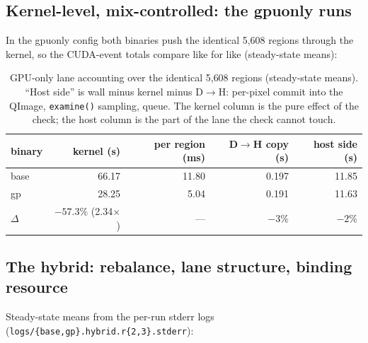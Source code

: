 \documentclass[
	english,
	letterpaper, oneside
]{article}
\begin{document}
\subsection{Kernel-level, mix-controlled: the gpuonly runs}

In the gpuonly config both binaries push the identical 5{,}608 regions
through the kernel, so the CUDA-event totals compare like for like
(steady-state means):

\begin{table}[H]
\centering
\caption{GPU-only lane accounting over the identical 5{,}608 regions
(steady-state means). ``Host side'' is wall minus kernel minus D$\to$H:
per-pixel commit into the QImage, \texttt{examine()} sampling, queue. The
kernel column is the pure effect of the check; the host column is the part
of the lane the check cannot touch.}
\label{tab:gpuonly}
\small
\begin{tabular}{lrrrr}
\toprule
binary & kernel (s) & per region (ms) & D$\to$H copy (s) & host side (s) \\
\midrule
base & 66.17 & 11.80 & 0.197 & 11.85 \\
gp   & 28.25 & 5.04 & 0.191 & 11.63 \\
\midrule
$\Delta$ & $-57.3\%$ (2.34$\times$) & --- & $-3\%$ & $-2\%$ \\
\bottomrule
\end{tabular}
\end{table}

\subsection{The hybrid: rebalance, lane structure, binding resource}

Steady-state means from the per-run stderr logs
(\texttt{logs/\{base,gp\}.hybrid.r\{2,3\}.stderr}):
\end{document}
